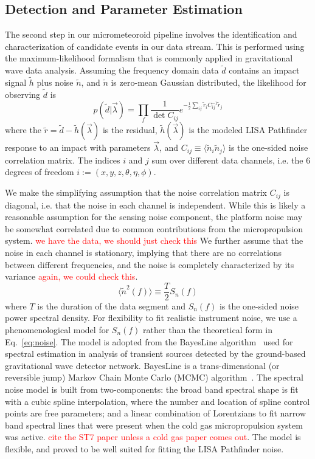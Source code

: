 \documentclass[twocolumn, trackchanges]{aastex62}
\newcommand{\red}[1]{\textcolor{red}{#1}}
\newcommand{\data}{\tilde d}
\newcommand{\model}{\tilde h}
\newcommand{\residual}{\tilde r}
\newcommand{\params}{{\vec \lambda}}
\newcommand{\n}{\tilde n}
\newcommand{\Cij}{C_{ij}}
\newcommand{\invCij}{C_{ij}^{-1}}
\begin{document}
\subsection{Detection and Parameter Estimation}\label{sec:MCMC}
The second step in our micrometeoroid pipeline involves the identification and characterization of candidate events in our data stream.  This is performed using the maximum-likelihood formalism that is commonly applied in gravitational wave data analysis. 
Assuming the frequency domain data $\data$ contains an impact signal $\model$ plus noise $\n$, and $\n$ is zero-mean Gaussian distributed, the likelihood for observing  $\data$ is
\begin{equation}
p(\data|\params) = \prod_f \frac{1}{\det \Cij} e^{-\frac{1}{2}\sum_{ij} \residual_i \invCij \residual_j }
\label{eq:likelihood}
\end{equation}
where the $\residual = \data - \model(\params)$ is the residual, $\model(\params)$ is the modeled LISA Pathfinder response to an impact with parameters $\params$, and  $\Cij \equiv \langle \n_i \n_j\rangle$ is the one-sided noise correlation matrix. The indices $i$ and $j$ sum over different data channels, i.e. the 6 degrees of freedom $i:=(x,y,z,\theta,\eta,\phi)$.

We make the simplifying assumption that the noise correlation matrix $\Cij$ is diagonal, i.e. that the noise in each channel is independent. While this is likely a reasonable assumption for the sensing noise component, the platform noise may be somewhat correlated due to common contributions from the micropropulsion system. \red{we have the data, we should just check this}
We further assume that the noise in each channel is stationary, implying that there are no  correlations between different frequencies, and the noise is completely characterized by its variance  \red{again, we could check this}.
\begin{equation}
\langle \n^2(f)\rangle \equiv \frac{T}{2}S_n(f)
\end{equation}
where $T$ is the duration of the data segment and $S_n(f)$ is the one-sided noise power spectral density.
For flexibility to fit realistic instrument noise, we use a phenomenological model for $S_n(f)$ rather than the theoretical form in Eq.~\ref{eq:noise}.
The model is adopted from the BayesLine algorithm~\citep{Littenberg_15} used for spectral estimation in analysis of transient sources detected by the ground-based gravitational wave detector network.
BayesLine is a trans-dimensional (or reversible jump) Markov Chain Monte Carlo (MCMC) algorithm~\citep{Green_95}.
The spectral noise model is built from two-components:  the broad band spectral shape is fit with a cubic spline interpolation, where the number and location of spline control points are free parameters; and a linear combination of  Lorentzians to fit narrow band spectral lines that were present when the cold gas micropropulsion system was active. \red{cite the ST7 paper unless a cold gas paper comes out}.
The model is flexible, and proved to be well suited for fitting the LISA Pathfinder noise.
\end{document}
